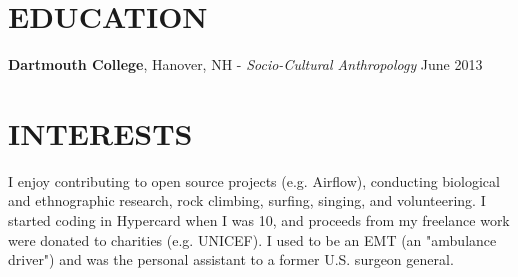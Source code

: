 \documentclass[a4paper, 12pt]{article}
\begin{document}
\section*{EDUCATION}
\vspace{-3mm}
{\bf Dartmouth College}, Hanover, NH - {\sl Socio-Cultural Anthropology} \hfill June 2013
                 
\section*{INTERESTS}
\vspace{-3mm}
I enjoy contributing to open source projects (e.g. Airflow), conducting biological and ethnographic research, rock climbing, surfing, singing, and volunteering.  I started coding in Hypercard when I was 10, and proceeds from my freelance work were donated to charities (e.g. UNICEF).  I used to be an EMT (an "ambulance driver") and was the personal assistant to a former U.S. surgeon general.


                
\end{document}
